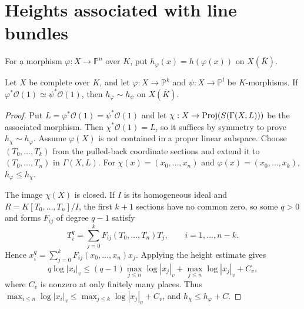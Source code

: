 
\section{Heights associated with line bundles}
\label{mumford-appendix-II-heights-line-bundles}

For a morphism $\varphi:X\to\mathbb P^n$ over $K$, put
$h_\varphi(x)=h(\varphi(x))$ on $X(\overline K)$.

\begin{proposition}
\label{mumford-prop-morphism-height-equivalence}
Let $X$ be complete over $K$, and let $\varphi:X\to\mathbb P^k$ and
$\psi:X\to\mathbb P^l$ be $K$-morphisms. If
$\varphi^*\mathcal O(1)\simeq\psi^*\mathcal O(1)$, then
$h_\varphi\sim h_\psi$ on $X(\overline K)$.
\end{proposition}
\begin{proof}
Put $L=\varphi^*\mathcal O(1)=\psi^*\mathcal O(1)$ and let
$\chi:X\to{\rm Proj}(S(\Gamma(X,L)))$ be the associated morphism. Then
$\chi^*\mathcal O(1)=L$, so it suffices by symmetry to prove
$h_\chi\sim h_\varphi$. Assume $\varphi(X)$ is not contained in a proper
linear subspace. Choose $(T_0,\ldots,T_k)$ from the pulled-back coordinate
sections and extend it to $(T_0,\ldots,T_n)$ in $\Gamma(X,L)$. For
$\chi(x)=(x_0,\ldots,x_n)$ and $\varphi(x)=(x_0,\ldots,x_k)$,
$h_\varphi\le h_\chi$.

The image $\chi(X)$ is closed. If $I$ is its homogeneous ideal and
$R=K[T_0,\ldots,T_n]/I$, the first $k+1$ sections have no common zero, so
some $q>0$ and forms $F_{ij}$ of degree $q-1$ satisfy
\[
 T_i^q=\sum_{j=0}^kF_{ij}(T_0,\ldots,T_n)T_j,
 \qquad i=1,\ldots,n-k. \tag{7}
\]
Hence
$x_i^q=\sum_{j=0}^kF_{ij}(x_0,\ldots,x_n)x_j$. Applying the height estimate
gives
\[
 q\log|x_i|_v\le(q-1)\max_{j\le n}\log|x_j|_v+
 \max_{j\le n}\log|x_j|_v+C_v,
\]
where $C_v$ is nonzero at only finitely many places. Thus
$\max_{i\le n}\log|x_i|_v\le\max_{j\le k}\log|x_j|_v+C_v$, and
$h_\chi\le h_\varphi+C$.

\end{proof}


